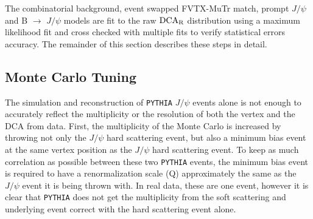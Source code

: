 \documentclass[12pt]{article}
\newcommand{\jpsi}{$J/\psi$ }
\newcommand{\pythia}{\texttt{PYTHIA} }
\newcommand{\dcar}{$\rm{DCA}_{R}$ }
\begin{document}
The combinatorial background, event swapped FVTX-MuTr match, prompt \jpsi and B $\to$ \jpsi models are fit to the raw \dcar distribution using a
maximum likelihood fit and cross checked with multiple fits to verify statistical errors accuracy. The remainder of this section describes these steps in detail.

\subsection{Monte Carlo Tuning}
\label{sec:MCTuning}


The simulation and reconstruction of \pythia \jpsi events alone is not enough to accurately reflect the multiplicity or the resolution of
both the vertex and the DCA from data.  First, the multiplicity of the Monte Carlo is increased by throwing not only the \jpsi hard scattering event,
but also a minimum bias event at the same vertex position as the \jpsi hard scattering event.  To keep as much correlation as possible between these
two \pythia events, the minimum bias event is required to have a renormalization scale (Q) approximately the same as the \jpsi event it is being thrown 
with.  In real data, these are one event, however it is clear that \pythia does not get the multiplicity from the soft scattering and underlying event correct 
with the hard scattering event alone. 



\end{document}

